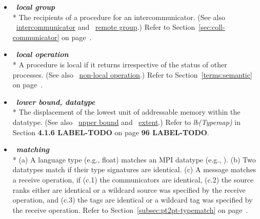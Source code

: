 \begin{itemize}
\label{glossary:local_group}
\item  ~\hypertarget{glossary:local_group}{\emph{\textbf{local group}}} \\*
The recipients of a procedure for an intercommunicator. 
(See also ~\hyperlink{glossary:intercommunicator}{intercommunicator} and
~\hyperlink{glossary:remote_group}{remote group}.)
Refer to Section~\ref{sec:coll-communicator} on page~\pageref{sec:coll-communicator}.

\label{glossary:local operation}
\item  ~\hypertarget{glossary:local_operation}{\emph{\textbf{local operation}}} \\*
A procedure is local if 
it returns irrespective of the status of other processes.
(See also ~\hyperlink{glossary:non-local_operation}{non-local operation}.)
Refer to Section~\ref{terms:semantic} on page~\pageref{terms:semantic}.

\label{glossary:lower_bound_datatype}
\item  ~\hypertarget{glossary:lower_bound_datatype}{\emph{\textbf{lower bound, datatype}}} \\*
The displacement of the lowest unit of addressable memory within the datatype. 
(See also ~\hyperlink{glossary:upper_bound}{upper bound} and ~\hyperlink{glossary:extent}{extent}.)
Refer to \emph{lb(Typemap)} in Section {\bf 4.1.6 LABEL-TODO} on page {\bf 96 LABEL-TODO}.

\label{glossary:matching}
\item  ~\hypertarget{glossary:matching}{\emph{\textbf{matching}}} \\*
(a) A language type (e.g., float) matches an MPI datatype (e.g., ). 
(b) Two datatypes match if their type signatures are identical.
(c) A message matches a receive operation, if (c.1) the communicators are identical, 
(c.2) the source ranks either are identical or a wildcard source was specified by the receive operation, 
and (c.3) the tags are identical or a wildcard tag was specified by the receive operation.
 Refer to Section~\ref{subsec:pt2pt-typematch} on page~\pageref{subsec:pt2pt-typematch}.


\end{itemize}
